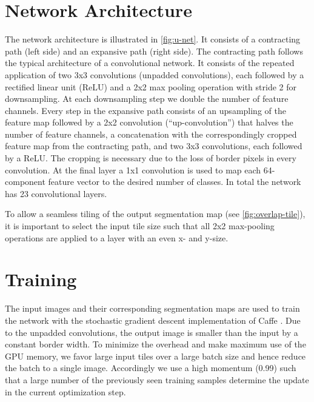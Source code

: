 \documentclass{llncs}
\begin{document}
\section{Network Architecture}
The network architecture is illustrated in \autoref{fig:u-net}. It consists of a contracting path (left side) and an expansive path (right side). The contracting path follows the typical architecture of a convolutional network. It consists of the repeated application of two 3x3 convolutions (unpadded convolutions), each followed by a rectified linear unit (ReLU) and a 2x2 max pooling operation with stride 2 for downsampling. At each downsampling step we double the number of feature channels. Every step in the expansive path consists of an upsampling of the feature map followed by a 2x2 convolution (``up-convolution'') that halves the number of feature channels, a concatenation with the correspondingly cropped feature map from the contracting path, and two 3x3 convolutions, each followed by a ReLU. The cropping is necessary due to the loss of border pixels in every convolution. At the final layer a 1x1 convolution is used to map each 64-component feature vector to the desired number of classes. In total the network has 23 convolutional layers.

To allow a seamless tiling of the output segmentation map (see \autoref{fig:overlap-tile}), it is important to select the input tile size such that all 2x2 max-pooling operations are applied to a layer with an even x- and y-size.

\section{Training}
The input images and their corresponding segmentation maps are used to train the network with the stochastic gradient descent implementation of Caffe \cite{Caffe}.
Due to the unpadded convolutions, the output image is smaller than the input by a constant border width. To minimize the overhead and make maximum use of the GPU memory, we favor large input tiles over a large batch size and hence reduce the batch to a single image. Accordingly we use a high momentum (0.99) such that a large number of the previously seen training samples determine the update in the current optimization step.
\end{document}
